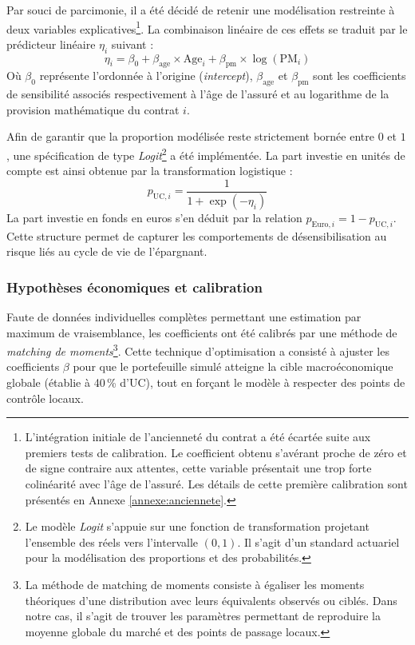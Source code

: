 Par souci de parcimonie, il a été décidé de retenir une modélisation restreinte à deux variables explicatives\footnote{L'intégration initiale de l'ancienneté du contrat a été écartée suite aux premiers tests de calibration. Le coefficient obtenu s'avérant proche de zéro et de signe contraire aux attentes, cette variable présentait une trop forte colinéarité avec l'âge de l'assuré. Les détails de cette première calibration sont présentés en Annexe \ref{annexe:anciennete}.}. La combinaison linéaire de ces effets se traduit par le prédicteur linéaire $\eta_i$ suivant :
\begin{equation}
    \eta_i = \beta_0 + \beta_{\text{age}} \times \text{Age}_i + \beta_{\text{pm}} \times \log(\text{PM}_i)
\end{equation}
Où $\beta_0$ représente l'ordonnée à l'origine (\textit{intercept}), $\beta_{\text{age}}$ et $\beta_{\text{pm}}$ sont les coefficients de sensibilité associés respectivement à l'âge de l'assuré et au logarithme de la provision mathématique du contrat $i$. 

Afin de garantir que la proportion modélisée reste strictement bornée entre $0$ et $1$, une spécification de type \textit{Logit}\footnote{Le modèle \textit{Logit} s'appuie sur une fonction de transformation projetant l'ensemble des réels vers l'intervalle $(0,1)$. Il s'agit d'un standard actuariel pour la modélisation des proportions et des probabilités.} a été implémentée. La part investie en unités de compte est ainsi obtenue par la transformation logistique :
\begin{equation}
    p_{\text{UC},i} = \frac{1}{1 + \exp(-\eta_i)}
\end{equation}
La part investie en fonds en euros s'en déduit par la relation $p_{\text{Euro},i} = 1 - p_{\text{UC},i}$. Cette structure permet de capturer les comportements de désensibilisation au risque liés au cycle de vie de l'épargnant.

\subsubsection*{Hypothèses économiques et calibration}

Faute de données individuelles complètes permettant une estimation par maximum de vraisemblance, les coefficients ont été calibrés par une méthode de \textit{matching de moments}\footnote{La méthode de matching de moments consiste à égaliser les moments théoriques d'une distribution avec leurs équivalents observés ou ciblés. Dans notre cas, il s'agit de trouver les paramètres permettant de reproduire la moyenne globale du marché et des points de passage locaux.}. Cette technique d'optimisation a consisté à ajuster les coefficients $\beta$ pour que le portefeuille simulé atteigne la cible macroéconomique globale (établie à 40\,\% d'UC), tout en forçant le modèle à respecter des points de contrôle locaux.

